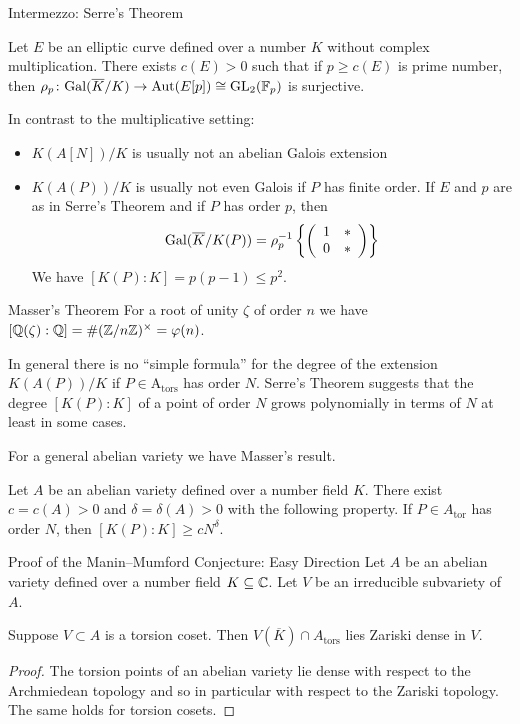 \documentclass{beamer}
\begin{document}
\begin{frame}{Intermezzo: Serre's Theorem}
  \begin{theorem}[Serre]
    Let $E$ be  an elliptic curve defined over a number $K$
    \alert{without} complex multiplication.
    There exists $c(E)>0$ such that
    if $p\ge c(E)$ is prime number, then $\rho_p \colon
    \mathrm{Gal}(\overline{K}/K)\rightarrow \mathrm{Aut}(E[p]) \cong \mathrm{GL}_2({\mathbb{F}}_p)$
    is surjective.  
  \end{theorem}

  In contrast to the multiplicative setting:
  \begin{itemize}
  \item 
    $K(A[N])/K$ is usually \alert{not} an  \alert{abelian} Galois extension
  \item 
     $K(A(P))/K$ is usually  \alert{not}  even Galois if $P$ has finite
     order. If  $E$
     and $p$ are as in Serre's Theorem and if $P$ has order $p$, then
     \begin{equation*}
       \mathrm{Gal}(\overline K/K(P))=       \rho_p^{-1} \left\{\left( \begin{array}{cc} {1} & {*} \\ {0} & {*} \end{array} \right)\right\}
     \end{equation*}
     We have $[K(P):K] = p(p-1) \le p^2$. 
   \end{itemize}   
\end{frame}

\begin{frame}{Masser's Theorem}
  For a root of unity $\zeta$ of order $n$ we have $[{\mathbb{Q}}(\zeta):{\mathbb{Q}}] =
  \#({\mathbb{Z}}/n{\mathbb{Z}})^\times =\varphi(n)$.
  
  In general there is no ``simple formula'' for the degree of the
  extension $K(A(P))/K$ if $P\in \mathrm{A}_{\mathrm{tors}}$ has order
  $N$.
  Serre's Theorem
  suggests that the degree $[K(P):K]$ of a point of order $N$ grows
  polynomially in terms of $N$ at least in some cases.

  For a general abelian variety we have Masser's result. 
  
  \begin{theorem}[Masser]
    Let $A$ be an abelian variety defined over a number field $K$. There
    exist $c=c(A)>0$ and $\delta=\delta(A)>0$ with the following
    property. If $P \in A_{\mathrm{tor}}$ has order $N$, then
    $[K(P):K]\ge c N^{\delta}$. 
  \end{theorem}
\end{frame}

\begin{frame}{Proof of the Manin--Mumford Conjecture: Easy Direction}
  Let $A$ be an abelian variety defined over a number field
  $K\subseteq{\mathbb{C}}$.
  Let $V$ be an irreducible subvariety of $A$.

  
  \begin{lemma}
    Suppose $V\subset A$ is a torsion coset. Then $V(\overline K)\cap
    A_{\mathrm{tors}}$ lies Zariski dense in $V$. 
  \end{lemma}
  \begin{proof}
    The torsion points of an abelian variety lie dense with respect to
    the Archmiedean topology and so in particular with respect to the
    Zariski topology. The same holds for torsion cosets. 
  \end{proof}
\end{frame}
\end{document}
